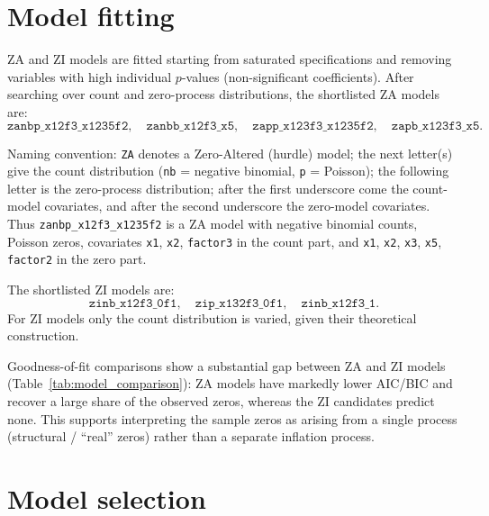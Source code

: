 \documentclass[11pt,a4paper]{article}
\begin{document}
\section{Model fitting}

ZA and ZI models are fitted starting from saturated specifications and removing
variables with high individual $p$-values (non-significant coefficients). After
searching over count and zero-process distributions, the shortlisted ZA models
are:
\[
\texttt{zanbp\_x12f3\_x1235f2},\quad
\texttt{zanbb\_x12f3\_x5},\quad
\texttt{zapp\_x123f3\_x1235f2},\quad
\texttt{zapb\_x123f3\_x5}.
\]

Naming convention: \texttt{ZA} denotes a Zero-Altered (hurdle) model; the next
letter(s) give the count distribution (\texttt{nb} = negative binomial,
\texttt{p} = Poisson); the following letter is the zero-process distribution;
after the first underscore come the count-model covariates, and after the second
underscore the zero-model covariates. Thus
\texttt{zanbp\_x12f3\_x1235f2} is a ZA model with negative binomial counts,
Poisson zeros, covariates \texttt{x1}, \texttt{x2}, \texttt{factor3} in the
count part, and \texttt{x1}, \texttt{x2}, \texttt{x3}, \texttt{x5},
\texttt{factor2} in the zero part.

The shortlisted ZI models are:
\[
\texttt{zinb\_x12f3\_0f1},\quad
\texttt{zip\_x132f3\_0f1},\quad
\texttt{zinb\_x12f3\_1}.
\]
For ZI models only the count distribution is varied, given their theoretical
construction.

Goodness-of-fit comparisons show a substantial gap between ZA and ZI models
(Table~\ref{tab:model_comparison}): ZA models have markedly lower AIC/BIC and
recover a large share of the observed zeros, whereas the ZI candidates predict
none. This supports interpreting the sample zeros as arising from a single
process (structural / ``real'' zeros) rather than a separate inflation process.

\begin{table}[htbp]
  \centering
  \caption{Performance of shortlisted ZA and ZI models on the full sample,
  ordered by ascending AIC. Residual SD is the standard deviation of model
  residuals; predicted zeros count fitted values rounded to zero.}
  \label{tab:model_comparison}
  \small
  
\end{table}

\section{Model selection}
\end{document}
